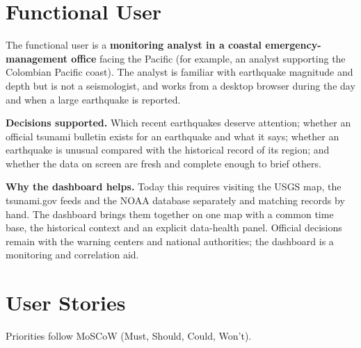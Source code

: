\documentclass[a4paper,11pt,oneside]{book}
\begin{document}
\section{Functional User}
The functional user is a \textbf{monitoring analyst in a coastal emergency-management office} facing the Pacific (for example, an analyst supporting the Colombian Pacific coast).
The analyst is familiar with earthquake magnitude and depth but is not a seismologist, and works from a desktop browser during the day and when a large earthquake is reported.

\textbf{Decisions supported.} Which recent earthquakes deserve attention; whether an official tsunami bulletin exists for an earthquake and what it says; whether an earthquake is unusual compared with the historical record of its region; and whether the data on screen are fresh and complete enough to brief others.

\textbf{Why the dashboard helps.} Today this requires visiting the USGS map, the tsunami.gov feeds and the NOAA database separately and matching records by hand.
The dashboard brings them together on one map with a common time base, the historical context and an explicit data-health panel.
Official decisions remain with the warning centers and national authorities; the dashboard is a monitoring and correlation aid.

\section{User Stories}
Priorities follow MoSCoW (Must, Should, Could, Won't).
\end{document}
